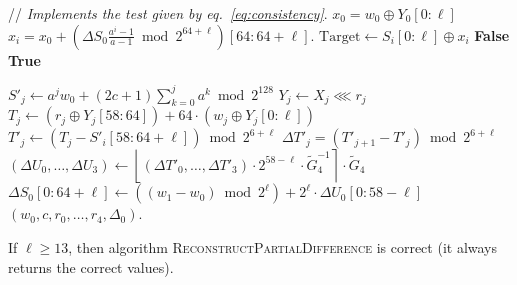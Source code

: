 \documentclass[preprint,svgnames]{iacrtrans}
\begin{document}
\begin{algorithmic}[1]
  \State // \emph{Implements the test given by eq.~\eqref{eq:consistency}}.
  \State $x_0 = w_0 \oplus Y_0[0:\ell]$ 
  \State $x_i = x_0 + \left(\Delta S_0 \frac{a^i-1}{a-1} \bmod 2^{64+\ell}\right)[64:64+\ell]$. 
  \State $\mathrm{Target} \gets S_i[0:\ell] \oplus x_i$
  \State \Return \textbf{False} 
  \EndIf
  \EndFor
  \State \Return \textbf{True} 
  \EndProcedure

\State 
  
   
  \State $S'_j \gets a^j w_0 + (2c+1) \sum_{k = 0}^j a^k \bmod 2^{128}$ 
   
  \State $Y_j \gets X_j \lll r_j$ 
  \State $T_j \gets \left(r_j \oplus Y_j[58:64]\right) +  64 \cdot \left(w_j \oplus Y_j[0:\ell]\right)$ 
  \State $T'_j \gets (T_j -  S'_i[58:64+\ell]) \bmod 2^{6+\ell}$ 
  \State $\Delta T'_j = (T'_{j+1} - T'_j) \bmod 2^{6 + \ell}$  
  \State $(\Delta U_0, \dots, \Delta U_3) \gets \left\lfloor (\Delta T'_0, \dots, \Delta T'_3) \cdot 2^{58-\ell} \cdot \widetilde G_4^{-1} \right\rceil \cdot \widetilde G_4$ 
  \State $\Delta S_0[0:64+\ell] \gets \left((w_1 - w_0) \bmod 2^{\ell}\right) + 2^{\ell} \cdot \Delta U_0[0:58-\ell]$ 
  \State \Return $(w_0, c, r_0, \dots, r_4, \Delta_0)$.
  \EndIf
  \EndFor
  \EndFor
  \EndProcedure
\end{algorithmic}


\begin{theorem}
  If $\ell \geq 13$, then algorithm \textsc{ReconstructPartialDifference} is
  correct (it always returns the correct values).
\end{theorem}
\end{document}

